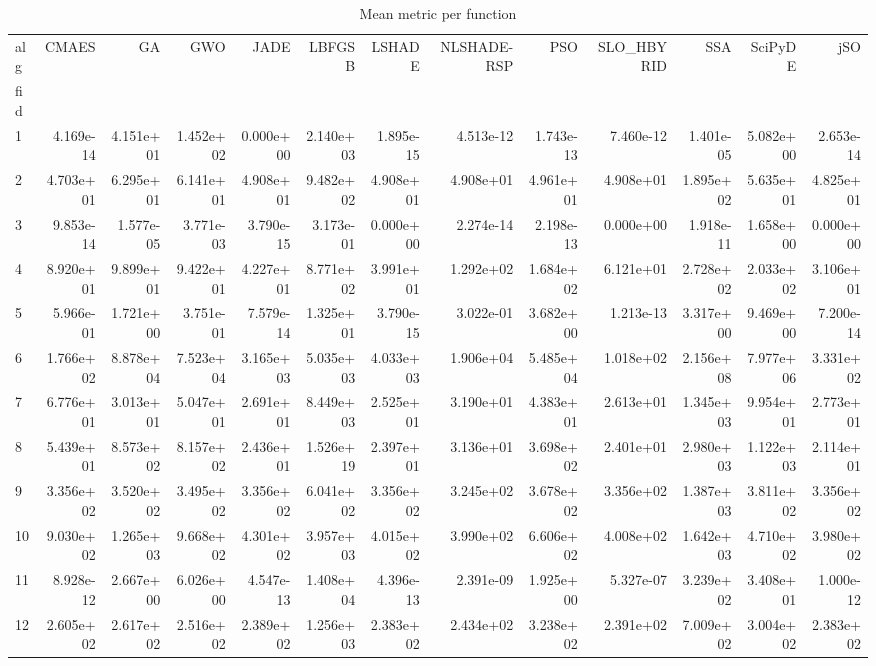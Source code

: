 \begin{table}
\caption{Mean metric per function}
\label{tab:mean_all}
\begin{tabular}{lrrrrrrrrrrrr}
\toprule
alg & CMAES & GA & GWO & JADE & LBFGSB & LSHADE & NLSHADE-RSP & PSO & SLO_HBYRID & SSA & SciPyDE & jSO \\
fid &  &  &  &  &  &  &  &  &  &  &  &  \\
\midrule
1 & 4.169e-14 & 4.151e+01 & 1.452e+02 & 0.000e+00 & 2.140e+03 & 1.895e-15 & 4.513e-12 & 1.743e-13 & 7.460e-12 & 1.401e-05 & 5.082e+00 & 2.653e-14 \\
2 & 4.703e+01 & 6.295e+01 & 6.141e+01 & 4.908e+01 & 9.482e+02 & 4.908e+01 & 4.908e+01 & 4.961e+01 & 4.908e+01 & 1.895e+02 & 5.635e+01 & 4.825e+01 \\
3 & 9.853e-14 & 1.577e-05 & 3.771e-03 & 3.790e-15 & 3.173e-01 & 0.000e+00 & 2.274e-14 & 2.198e-13 & 0.000e+00 & 1.918e-11 & 1.658e+00 & 0.000e+00 \\
4 & 8.920e+01 & 9.899e+01 & 9.422e+01 & 4.227e+01 & 8.771e+02 & 3.991e+01 & 1.292e+02 & 1.684e+02 & 6.121e+01 & 2.728e+02 & 2.033e+02 & 3.106e+01 \\
5 & 5.966e-01 & 1.721e+00 & 3.751e-01 & 7.579e-14 & 1.325e+01 & 3.790e-15 & 3.022e-01 & 3.682e+00 & 1.213e-13 & 3.317e+00 & 9.469e+00 & 7.200e-14 \\
6 & 1.766e+02 & 8.878e+04 & 7.523e+04 & 3.165e+03 & 5.035e+03 & 4.033e+03 & 1.906e+04 & 5.485e+04 & 1.018e+02 & 2.156e+08 & 7.977e+06 & 3.331e+02 \\
7 & 6.776e+01 & 3.013e+01 & 5.047e+01 & 2.691e+01 & 8.449e+03 & 2.525e+01 & 3.190e+01 & 4.383e+01 & 2.613e+01 & 1.345e+03 & 9.954e+01 & 2.773e+01 \\
8 & 5.439e+01 & 8.573e+02 & 8.157e+02 & 2.436e+01 & 1.526e+19 & 2.397e+01 & 3.136e+01 & 3.698e+02 & 2.401e+01 & 2.980e+03 & 1.122e+03 & 2.114e+01 \\
9 & 3.356e+02 & 3.520e+02 & 3.495e+02 & 3.356e+02 & 6.041e+02 & 3.356e+02 & 3.245e+02 & 3.678e+02 & 3.356e+02 & 1.387e+03 & 3.811e+02 & 3.356e+02 \\
10 & 9.030e+02 & 1.265e+03 & 9.668e+02 & 4.301e+02 & 3.957e+03 & 4.015e+02 & 3.990e+02 & 6.606e+02 & 4.008e+02 & 1.642e+03 & 4.710e+02 & 3.980e+02 \\
11 & 8.928e-12 & 2.667e+00 & 6.026e+00 & 4.547e-13 & 1.408e+04 & 4.396e-13 & 2.391e-09 & 1.925e+00 & 5.327e-07 & 3.239e+02 & 3.408e+01 & 1.000e-12 \\
12 & 2.605e+02 & 2.617e+02 & 2.516e+02 & 2.389e+02 & 1.256e+03 & 2.383e+02 & 2.434e+02 & 3.238e+02 & 2.391e+02 & 7.009e+02 & 3.004e+02 & 2.383e+02 \\
\bottomrule
\end{tabular}
\end{table}
